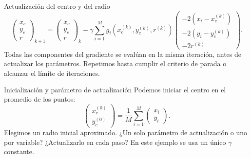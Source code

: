 \documentclass[main.tex]{subfiles}
\begin{document}
\begin{frame}[t]{Actualización del centro y del radio}
\small
\[\begin{pmatrix}x_c\\y_c\\r\end{pmatrix}_{k+1}
=\begin{pmatrix}x_c\\y_c\\r\end{pmatrix}_k
-\gamma\sum_{i=1}^M g_i(x_c^{(k)},y_c^{(k)},r^{(k)})
\begin{pmatrix}-2(x_i-x_c^{(k)})\\-2(y_i-y_c^{(k)})\\-2r^{(k)}\end{pmatrix}.\]
Todas las componentes del gradiente se evalúan en la misma iteración, antes de actualizar los parámetros.
\medskip
Repetimos hasta cumplir el criterio de parada o alcanzar el límite de iteraciones.
\end{frame}
\begin{frame}[t]{Inicialización y parámetro de actualización}
Podemos iniciar el centro en el promedio de los puntos:
\[\begin{pmatrix}x_c^{(0)}\\y_c^{(0)}\end{pmatrix}
=\frac1M\sum_{i=1}^M\begin{pmatrix}x_i\\y_i\end{pmatrix}.\]
Elegimos un radio inicial aproximado.
\medskip
¿Un solo parámetro de actualización o uno por variable? ¿Actualizarlo en cada paso?
\medskip
En este ejemplo se usa un único $\gamma$ constante.
\end{frame}
\end{document}
